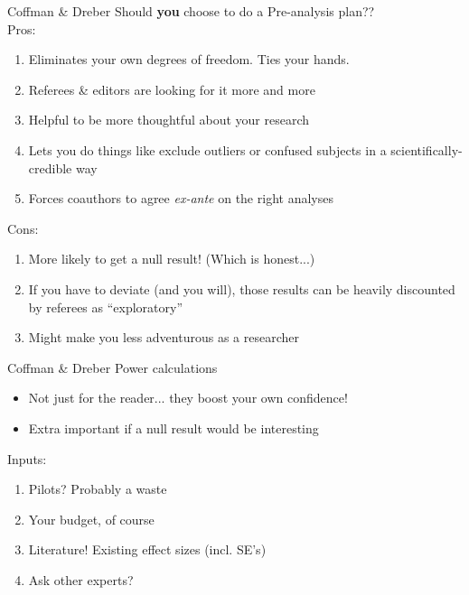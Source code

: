 \begin{frame}{Coffman \& Dreber}
    Should \textbf{you} choose to do a Pre-analysis plan??\\
    Pros:
    \begin{enumerate}
        \item Eliminates your own degrees of freedom. Ties your hands.
        \item Referees \& editors are looking for it more and more
        \item Helpful to be more thoughtful about your research
        \item Lets you do things like exclude outliers or confused subjects in a scientifically-credible way
        \item Forces coauthors to agree \textit{ex-ante} on the right analyses
    \end{enumerate}
    Cons:
    \begin{enumerate}
        \item More likely to get a null result! (Which is honest...)
        \item If you have to deviate (and you will), those results can be heavily discounted by referees as ``exploratory''
        \item Might make you less adventurous as a researcher
    \end{enumerate}
\end{frame}

\begin{frame}{Coffman \& Dreber}
    Power calculations
    \begin{itemize}
        \item Not just for the reader... they boost your own confidence!
        \item Extra important if a null result would be interesting
    \end{itemize}
    Inputs:
    \begin{enumerate}
        \item Pilots? Probably a waste
        \item Your budget, of course
        \item Literature! Existing effect sizes (incl. SE's)
        \item Ask other experts?
    \end{enumerate}
\end{frame}

